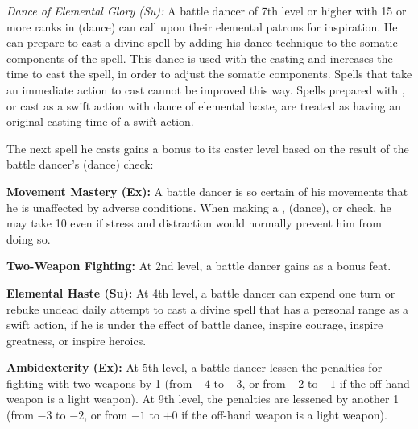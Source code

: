{\textit{Dance of Elemental Glory (Su):} A battle dancer of 7th level or higher with 15 or more ranks in  (dance) can call upon their elemental patrons for inspiration. He can prepare to cast a divine spell by adding his dance technique to the somatic components of the spell. This dance is used with the casting and increases the time to cast the spell, in order to adjust the somatic components. Spells that take an immediate action to cast cannot be improved this way. Spells prepared with , or cast as a swift action with dance of elemental haste, are treated as having an original casting time of a swift action.


The next spell he casts gains a bonus to its caster level based on the result of the battle dancer's  (dance) check:


\textbf{Movement Mastery (Ex):} A battle dancer is so certain of his movements that he is unaffected by adverse conditions. When making a ,  (dance), or  check, he may take 10 even if stress and distraction would normally prevent him from doing so.

\textbf{Two-Weapon Fighting:} At 2nd level, a battle dancer gains  as a bonus feat.

\textbf{Elemental Haste (Su):} At 4th level, a battle dancer can expend one turn or rebuke undead daily attempt to cast a divine spell that has a personal range as a swift action, if he is under the effect of battle dance, inspire courage, inspire greatness, or inspire heroics.

\textbf{Ambidexterity (Ex):} At 5th level, a battle dancer lessen the penalties for fighting with two weapons by 1 (from $-4$ to $-3$, or from $-2$ to $-1$ if the off-hand weapon is a light weapon). At 9th level, the penalties are lessened by another 1 (from $-3$ to $-2$, or from $-1$ to $+0$ if the off-hand weapon is a light weapon).
}